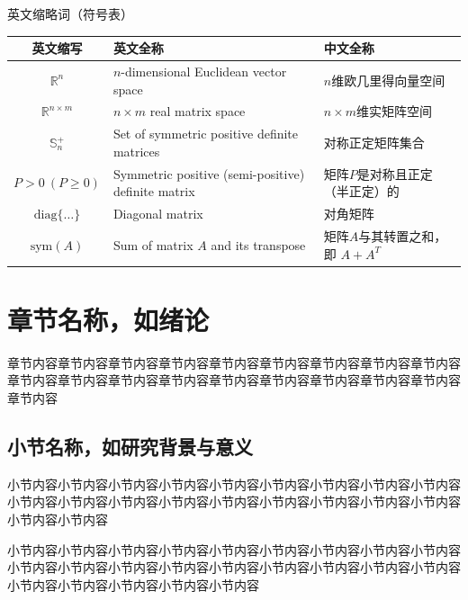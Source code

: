 \documentclass[a4paper, 12pt, oneside]{article}
\theoremstyle{cn_theorem}
\begin{document}
\clearpage
\centerline{\heiti 英文缩略词（符号表）}
\begin{center}
    \begin{tabularx}{\textwidth}{c >{\centering\arraybackslash}X >{\centering\arraybackslash}X}
        \toprule
        英文缩写 & 英文全称 & 中文全称 \\
        \midrule
        $\mathbb{R}^n$ & $n$-dimensional Euclidean vector space & $n$维欧几里得向量空间 \\
        $\mathbb{R}^{n \times m}$ & $n \times m$ real matrix space & $n \times m$维实矩阵空间 \\
        $\mathbb{S}_{n}^{+}$ & Set of symmetric positive definite matrices & 对称正定矩阵集合 \\
        $P > 0 \ (P \ge 0)$ & Symmetric positive (semi-positive) definite matrix & 矩阵$P$是对称且正定（半正定）的 \\
        $\mathrm{diag}\{\dots\}$ & Diagonal matrix & 对角矩阵 \\
        $\mathrm{sym}(A)$ & Sum of matrix $A$ and its transpose & 矩阵$A$与其转置之和，即 $A + A^T$ \\
        \bottomrule
    \end{tabularx}
\end{center}

\clearpage
\tableofcontents 

\clearpage
{}
\setcounter{page}{1}

\section{章节名称，如绪论}
章节内容章节内容章节内容章节内容章节内容章节内容章节内容章节内容章节内容章节内容章节内容章节内容章节内容章节内容章节内容章节内容章节内容章节内容章节内容

\subsection{小节名称，如研究背景与意义}
小节内容小节内容小节内容小节内容小节内容小节内容小节内容小节内容小节内容小节内容小节内容小节内容小节内容小节内容小节内容小节内容小节内容小节内容小节内容小节内容

小节内容小节内容小节内容小节内容小节内容小节内容小节内容小节内容小节内容小节内容小节内容小节内容小节内容小节内容小节内容小节内容小节内容小节内容小节内容小节内容小节内容小节内容小节内容
\end{document}

